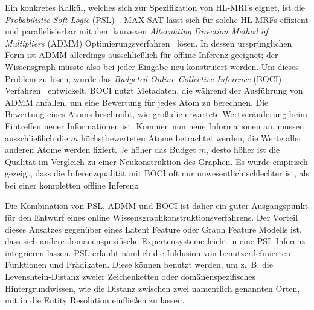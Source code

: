 Ein konkretes Kalkül, welches sich zur Spezifikation von HL-MRFs eignet, ist die \textit{Probabilistic Soft Logic} (PSL)~\cite{Broecheler2010}\cite{Bach2015}.
MAX-SAT lässt sich für solche HL-MRFs effizient und parallelisierbar mit dem konvexen \textit{Alternating Direction Method of Multipliers} (ADMM) Optimierungsverfahren~\cite{Boyd2011} lösen.
In dessen ursprünglichen Form ist ADMM allerdings ausschließlich für offline Inferenz geeignet;
der Wissensgraph müsste also bei jeder Eingabe neu konstruiert werden.
Um dieses Problem zu lösen, wurde das \textit{Budgeted Online Collective Inference} (BOCI) Verfahren~\cite{Pujara2015} entwickelt.
BOCI nutzt Metadaten, die während der Ausführung von ADMM anfallen, um eine Bewertung für jedes Atom zu berechnen.
Die Bewertung eines Atoms beschreibt, wie groß die erwartete Wertveränderung beim Eintreffen neuer Informationen ist.
Kommen nun neue Informationen an, müssen ausschließlich die $m$ höchstbewerteten Atome betrachtet werden, die Werte aller anderen Atome werden fixiert.
Je höher das Budget $m$, desto höher ist die Qualität im Vergleich zu einer Neukonstruktion des Graphen.
Es wurde empirisch gezeigt, dass die Inferenzqualität mit BOCI oft nur unwesentlich schlechter ist, als bei einer kompletten offline Inferenz.

Die Kombination von PSL, ADMM und BOCI ist daher ein guter Ausgangspunkt für den Entwurf eines online Wissensgraphkonstruktionsverfahrens.
Der Vorteil dieses Ansatzes gegenüber eines Latent Feature oder Graph Feature Modells ist, dass sich andere domänenspezifische Expertensysteme leicht in eine PSL Inferenz integrieren lassen.
PSL erlaubt nämlich die Inklusion von benutzerdefinierten Funktionen und Prädikaten.
Diese können benutzt werden, um z.~B. die Levenshtein-Distanz zweier Zeichenketten oder domänenspezifisches Hintergrundwissen, wie die Distanz zwischen zwei namentlich genannten Orten, mit in die Entity Resolution einfließen zu lassen.
